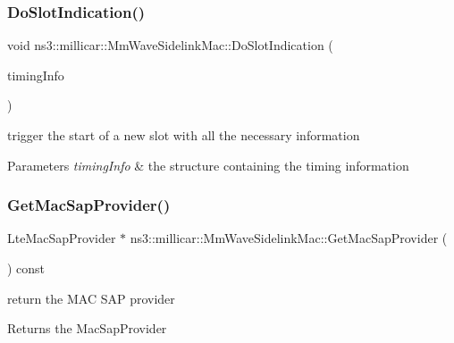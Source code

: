 \subsubsection{\texorpdfstring{Do\+Slot\+Indication()}{DoSlotIndication()}}
{\footnotesize\ttfamily void ns3\+::millicar\+::\+Mm\+Wave\+Sidelink\+Mac\+::\+Do\+Slot\+Indication (\begin{DoxyParamCaption}\item[{mmwave\+::\+Sfn\+Sf}]{timing\+Info }\end{DoxyParamCaption})}



trigger the start of a new slot with all the necessary information 


\begin{DoxyParams}{Parameters}
{\em timing\+Info} & the structure containing the timing information \\
\hline
\end{DoxyParams}
\mbox{\label{classns3_1_1millicar_1_1MmWaveSidelinkMac_a9ac166a4e4d5e2449cb0e69a165719cb}} 
\subsubsection{\texorpdfstring{Get\+Mac\+Sap\+Provider()}{GetMacSapProvider()}}
{\footnotesize\ttfamily Lte\+Mac\+Sap\+Provider $\ast$ ns3\+::millicar\+::\+Mm\+Wave\+Sidelink\+Mac\+::\+Get\+Mac\+Sap\+Provider (\begin{DoxyParamCaption}{ }\end{DoxyParamCaption}) const}



return the M\+AC S\+AP provider 

\begin{DoxyReturn}{Returns}
the Mac\+Sap\+Provider 
\end{DoxyReturn}
\mbox{\label{classns3_1_1millicar_1_1MmWaveSidelinkMac_ae6a8f2b11ed7ac5d33dc0629937695e6}} 
